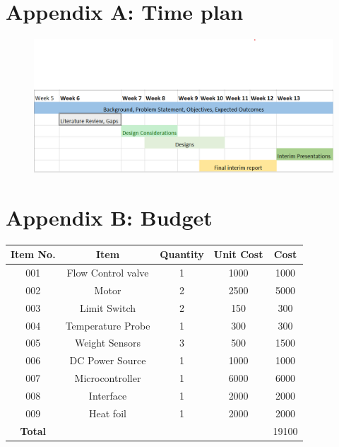 

\section*{Appendix A: Time plan}
\begin{figure}[ht]
\includegraphics[width=\linewidth]{Figures/timeplan.png}
\centering
\end{figure}
\section*{Appendix B: Budget}
\begin{table}[ht]
  \begin{center}
    \leavevmode
     \begin{tabular}{|c | c | c | c | c |}\hline
      \textbf{Item No.} &  \textbf{Item} & \textbf{Quantity} & \textbf{Unit Cost} & \textbf{Cost} \\
     \hline
     001 & Flow Control valve & 1 & 1000 &  1000 \\
     \hline
     002 & Motor & 2 & 2500 &  5000 \\
     \hline
     003 & Limit Switch & 2 & 150 &  300 \\
     \hline
     004 & Temperature Probe & 1 & 300 &  300 \\
     \hline
     005 & Weight Sensors & 3 & 500 & 1500 \\
     \hline
     006 & DC Power Source & 1 & 1000 &  1000 \\
     \hline
     007 & Microcontroller &  1 & 6000 & 6000 \\
     \hline
     008 & Interface  & 1 & 2000  & 2000 \\
     \hline
     009 & Heat foil & 1 & 2000 & 2000 \\
     \hline
     \textbf{Total} & & & & 19100 \\
     \hline
    \end{tabular}
    \label{table:1}
  \end{center}
\end{table}



    
